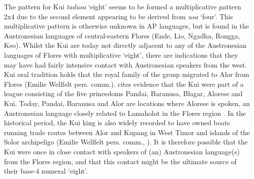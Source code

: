   The pattern for Kui \textit{tadusa} `eight' seems to be formed a multiplicative pattern 2x4 due to the second element appearing to be derived from \textit{usa} `four'. This multiplicative pattern is otherwise unknown in AP languages, but is found in the Austronesian languages of central-eastern Flores (Ende, Lio, Ngadha, Rongga, Keo). Whilst the Kui are today not directly adjacent to any of the Austronesian languages of Flores with multiplicative `eight', there are indications that they may have had fairly intensive contact with Austronesian speakers from the west. Kui oral tradition holds that the royal family of the group migrated to Alor from Flores (Emilie Wellfelt pers. comm.). \citet[38, fn. 36]{Hagerdal2012} cites evidence that the Kui were part of a league consisting of the five princedoms Pandai, Baranusa, Blagar, Alorese and Kui. Today, Pandai, Baranusa and Alor are locations where Alorese is spoken, an Austronesian language closely related to Lamaholot in the Flores region \citep{Klamer2011,Klamer2012}. In the historical period, the Kui king is also widely recorded to have owned boats running trade routes between Alor and Kupang in West Timor and islands of the Solor archipeligo (Emilie Wellfelt pers. comm., \citealt{Hagerdal2012}). It is therefore possible that the Kui were once in close contact with speakers of (an) Austronesian language(s) from the Flores region, and that this contact might be the ultimate source of their base-4 numeral `eight'.

